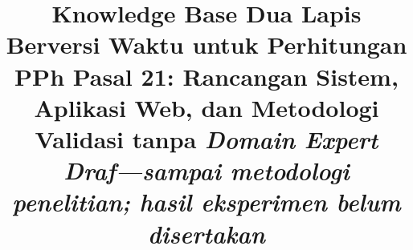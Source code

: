 \documentclass[conference,a4paper]{IEEEtran}
\begin{document}
\title{Knowledge Base Dua Lapis Berversi Waktu untuk Perhitungan PPh Pasal 21: Rancangan Sistem, Aplikasi Web, dan Metodologi Validasi tanpa \textit{Domain Expert}\\
{\normalsize\textit{Draf---sampai metodologi penelitian; hasil eksperimen belum disertakan}}}

\author{
}

\maketitle








\end{document}
